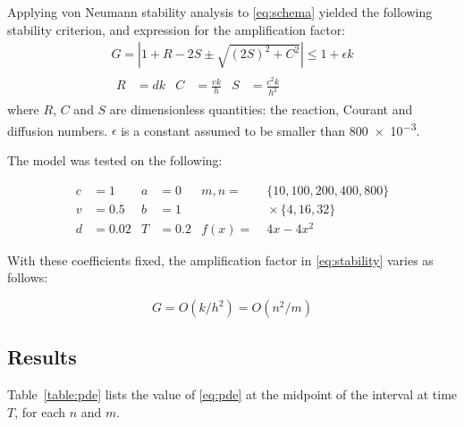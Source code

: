 \documentclass[a4paper,12pt,twocolumn]{article}
\begin{document}
Applying von Neumann stability analysis to \eqref{eq:schema} yielded the 
following stability criterion, and expression for the amplification factor:
{\footnotesize
    \begin{gather}
        \label{eq:stability}
        G = \left| 1 + R - 2S \pm \sqrt{(2S)^2 + C^2} \right|
            \leq 1 + \epsilon k \\
        \nonumber
        \begin{aligned}
            R &= dk & C &= \frac{vk}{h} & S &= \frac{c^2k}{h^2}
        \end{aligned}
    \end{gather}
}where $R$, $C$ and $S$ are dimensionless quantities: the reaction, Courant and 
diffusion numbers. $\epsilon$ is a constant assumed to be smaller than 
\num{800e-3}.

The model was tested on the following:
{\footnotesize
    \begin{align*}
        c &= 1    & a &= 0   & m,n  =&\;\{10,100,200,400,800\} \\
        v &= 0.5  & b &= 1   &       &\;\times \{4,16,32\} \\
        d &= 0.02 & T &= 0.2 & f(x) =&\;4x - 4x^2
    \end{align*}

}With these coefficients fixed, the amplification factor in \eqref{eq:stability}
varies as follows:
{\footnotesize
    \begin{equation} \label{eq:gain}
        G = O(k/h^2) = O(n^2/m)
    \end{equation}

}\subsection{Results}

Table~\ref{table:pde} lists the value of \eqref{eq:pde} at the midpoint of the 
interval at time $T$, for each $n$ and $m$.
\end{document}
